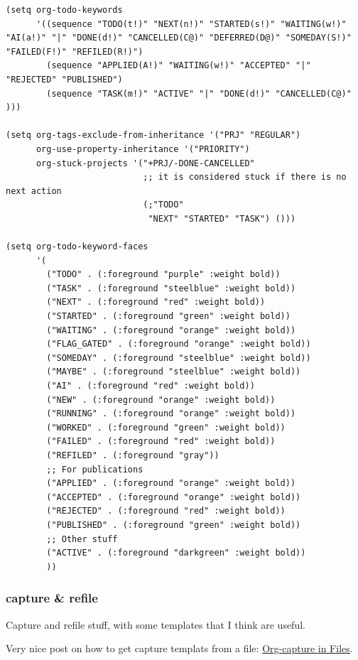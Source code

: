 \documentclass[11pt]{article}
\begin{document}
\begin{verbatim}
(setq org-todo-keywords
      '((sequence "TODO(t!)" "NEXT(n!)" "STARTED(s!)" "WAITING(w!)" "AI(a!)" "|" "DONE(d!)" "CANCELLED(C@)" "DEFERRED(D@)" "SOMEDAY(S!)" "FAILED(F!)" "REFILED(R!)")
        (sequence "APPLIED(A!)" "WAITING(w!)" "ACCEPTED" "|" "REJECTED" "PUBLISHED")
        (sequence "TASK(m!)" "ACTIVE" "|" "DONE(d!)" "CANCELLED(C@)" )))

(setq org-tags-exclude-from-inheritance '("PRJ" "REGULAR")
      org-use-property-inheritance '("PRIORITY")
      org-stuck-projects '("+PRJ/-DONE-CANCELLED"
                           ;; it is considered stuck if there is no next action
                           (;"TODO"
                            "NEXT" "STARTED" "TASK") ()))

(setq org-todo-keyword-faces
      '(
        ("TODO" . (:foreground "purple" :weight bold))
        ("TASK" . (:foreground "steelblue" :weight bold))
        ("NEXT" . (:foreground "red" :weight bold))
        ("STARTED" . (:foreground "green" :weight bold))
        ("WAITING" . (:foreground "orange" :weight bold))
        ("FLAG_GATED" . (:foreground "orange" :weight bold))
        ("SOMEDAY" . (:foreground "steelblue" :weight bold))
        ("MAYBE" . (:foreground "steelblue" :weight bold))
        ("AI" . (:foreground "red" :weight bold))
        ("NEW" . (:foreground "orange" :weight bold))
        ("RUNNING" . (:foreground "orange" :weight bold))
        ("WORKED" . (:foreground "green" :weight bold))
        ("FAILED" . (:foreground "red" :weight bold))
        ("REFILED" . (:foreground "gray"))
        ;; For publications
        ("APPLIED" . (:foreground "orange" :weight bold))
        ("ACCEPTED" . (:foreground "orange" :weight bold))
        ("REJECTED" . (:foreground "red" :weight bold))
        ("PUBLISHED" . (:foreground "green" :weight bold))
        ;; Other stuff
        ("ACTIVE" . (:foreground "darkgreen" :weight bold))
        ))
\end{verbatim}

\subsubsection{capture \& refile}
\label{sec:orgbd59a98}

Capture and refile stuff, with some templates that I think are useful.

Very nice post on how to get capture templats from a file: \href{https://joshrollinswrites.com/help-desk-head-desk/org-capture-in-files/}{Org-capture
in Files}.
\end{document}
